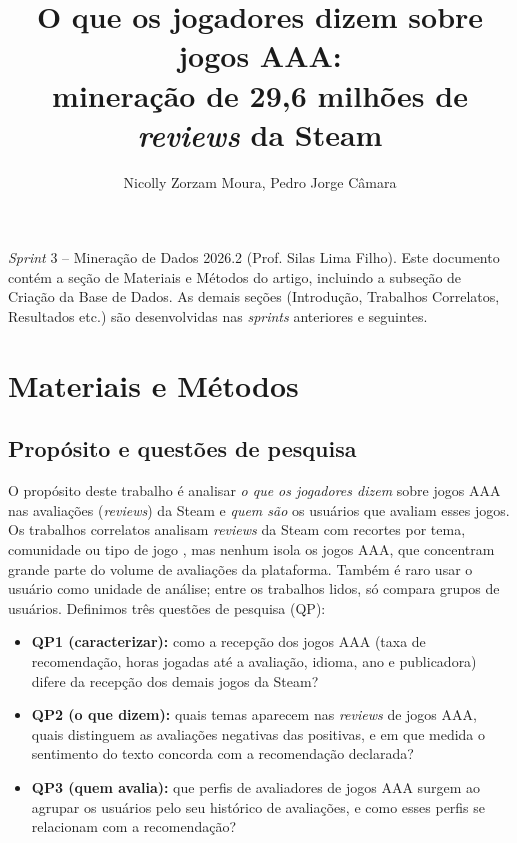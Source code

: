 \documentclass[12pt]{article}
\title{O que os jogadores dizem sobre jogos AAA:\\ mineração de 29,6 milhões de \textit{reviews} da Steam}
\author{Nicolly Zorzam Moura\inst{1}, Pedro Jorge Câmara\inst{1}}
\begin{document}
\maketitle

\begin{resumo}
\textit{Sprint} 3 -- Mineração de Dados 2026.2 (Prof. Silas Lima Filho). Este documento
contém a seção de Materiais e Métodos do artigo, incluindo a subseção de Criação da Base de Dados.
As demais seções (Introdução, Trabalhos Correlatos, Resultados etc.) são desenvolvidas nas
\textit{sprints} anteriores e seguintes.
\end{resumo}

\setcounter{section}{2}
\section{Materiais e Métodos}\label{sec:metodos}

\subsection{Propósito e questões de pesquisa}

O propósito deste trabalho é analisar \emph{o que os jogadores dizem} sobre jogos AAA nas
avaliações (\textit{reviews}) da Steam e \emph{quem são} os usuários que avaliam esses jogos.
Os trabalhos correlatos analisam \textit{reviews} da Steam com recortes por tema, comunidade ou
tipo de jogo \cite{bazzaz2026,byers2025,petrosino2022,gibrim2026}, mas nenhum isola os jogos
AAA, que concentram grande parte do volume de avaliações da plataforma. Também é raro usar o
usuário como unidade de análise; entre os trabalhos lidos, só \cite{gibrim2026} compara grupos de
usuários. Definimos três questões de pesquisa (QP):

\begin{itemize}
\item \textbf{QP1 (caracterizar):} como a recepção dos jogos AAA (taxa de recomendação, horas
jogadas até a avaliação, idioma, ano e publicadora) difere da recepção dos demais jogos da Steam?
\item \textbf{QP2 (o que dizem):} quais temas aparecem nas \textit{reviews} de jogos AAA,
quais distinguem as avaliações negativas das positivas, e em que medida o sentimento do texto
concorda com a recomendação declarada?
\item \textbf{QP3 (quem avalia):} que perfis de avaliadores de jogos AAA surgem ao agrupar os
usuários pelo seu histórico de avaliações, e como esses perfis se relacionam com a recomendação?
\end{itemize}
\end{document}
